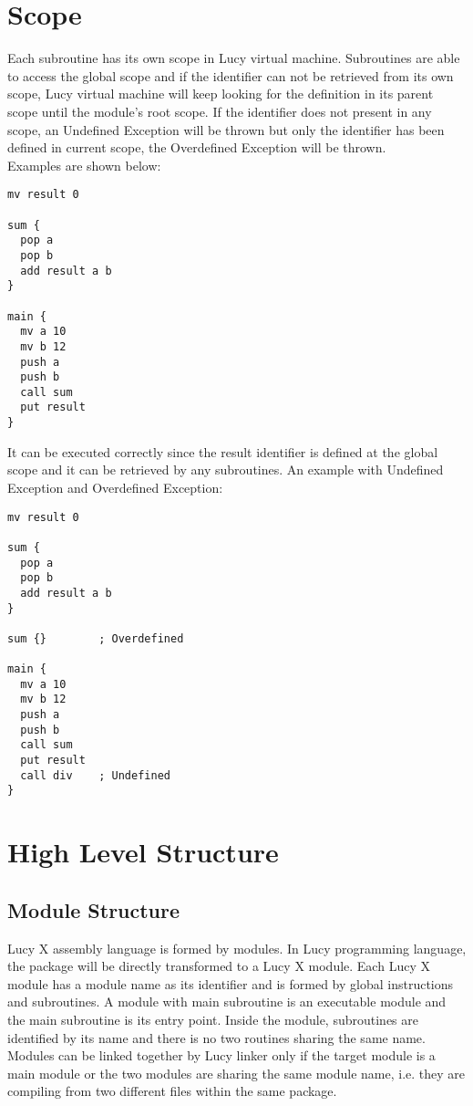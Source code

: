 \section{Scope}
Each subroutine has its own scope in Lucy virtual machine. Subroutines are able to access the global scope and if the identifier can not be retrieved from its own scope, Lucy virtual machine will keep looking for the definition in its parent scope until the module’s root scope. If the identifier does not present in any scope, an Undefined Exception will be thrown but only the identifier has been defined in current scope, the Overdefined Exception will be thrown. \\
Examples are shown below:
\begin{lstlisting}[language=LucyX]
mv result 0

sum {
  pop a
  pop b
  add result a b
}

main {
  mv a 10
  mv b 12
  push a
  push b
  call sum
  put result
}
\end{lstlisting}
It can be executed correctly since the result identifier is defined at the global scope and it can be retrieved by any subroutines.
An example with Undefined Exception and Overdefined Exception:
\begin{lstlisting}[language=LucyX]
mv result 0

sum {
  pop a
  pop b
  add result a b
}

sum {}        ; Overdefined

main {
  mv a 10
  mv b 12
  push a
  push b
  call sum
  put result
  call div    ; Undefined
}
\end{lstlisting}


\section{High Level Structure}
\subsection{Module Structure}
Lucy X assembly language is formed by modules. In Lucy programming language, the package will be directly transformed to a Lucy X module. Each Lucy X module has a module name as its identifier and is formed by global instructions and subroutines. A module with main subroutine is an executable module and the main subroutine is its entry point. Inside the module, subroutines are identified by its name and there is no two routines sharing the same name. Modules can be linked together by Lucy linker only if the target module is a main module or the two modules are sharing the same module name, i.e. they are compiling from two different files within the same package.


